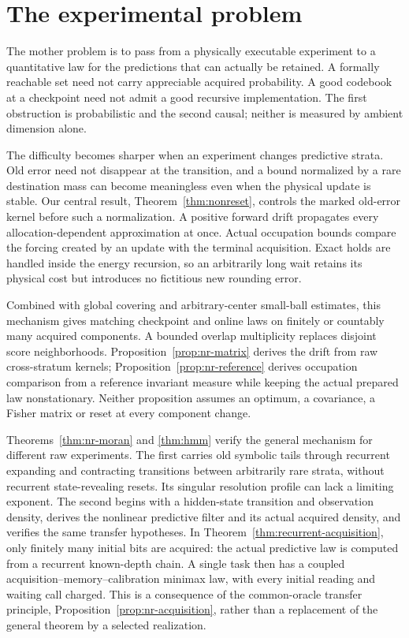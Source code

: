 \section{The experimental problem}\label{sec:experiment}
The mother problem is to pass from a physically executable experiment to a quantitative law for the predictions that can actually be retained. A formally reachable set need not carry appreciable acquired probability. A good codebook at a checkpoint need not admit a good recursive implementation. The first obstruction is probabilistic and the second causal; neither is measured by ambient dimension alone.

The difficulty becomes sharper when an experiment changes predictive strata. Old error need not disappear at the transition, and a bound normalized by a rare destination mass can become meaningless even when the physical update is stable. Our central result, Theorem~\ref{thm:nonreset}, controls the marked old-error kernel before such a normalization. A positive forward drift propagates every allocation-dependent approximation at once. Actual occupation bounds compare the forcing created by an update with the terminal acquisition. Exact holds are handled inside the energy recursion, so an arbitrarily long wait retains its physical cost but introduces no fictitious new rounding error.

Combined with global covering and arbitrary-center small-ball estimates, this mechanism gives matching checkpoint and online laws on finitely or countably many acquired components. A bounded overlap multiplicity replaces disjoint score neighborhoods. Proposition~\ref{prop:nr-matrix} derives the drift from raw cross-stratum kernels; Proposition~\ref{prop:nr-reference} derives occupation comparison from a reference invariant measure while keeping the actual prepared law nonstationary. Neither proposition assumes an optimum, a covariance, a Fisher matrix or reset at every component change.

Theorems~\ref{thm:nr-moran} and \ref{thm:hmm} verify the general mechanism for different raw experiments. The first carries old symbolic tails through recurrent expanding and contracting transitions between arbitrarily rare strata, without recurrent state-revealing resets. Its singular resolution profile can lack a limiting exponent. The second begins with a hidden-state transition and observation density, derives the nonlinear predictive filter and its actual acquired density, and verifies the same transfer hypotheses. In Theorem~\ref{thm:recurrent-acquisition}, only finitely many initial bits are acquired: the actual predictive law is computed from a recurrent known-depth chain. A single task then has a coupled acquisition--memory--calibration minimax law, with every initial reading and waiting call charged. This is a consequence of the common-oracle transfer principle, Proposition~\ref{prop:nr-acquisition}, rather than a replacement of the general theorem by a selected realization.

